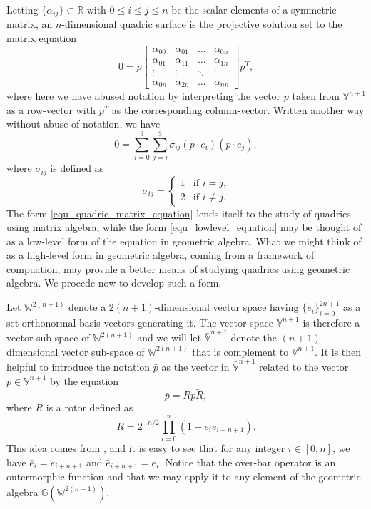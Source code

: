\documentclass{ecgd-l}
\theoremstyle{definition}
\theoremstyle{remark}
\numberwithin{equation}{section}
\newcommand{\G}{\mathbb{G}}
\newcommand{\V}{\mathbb{V}}
\newcommand{\Vb}{\mathbb{\bar{V}}}
\newcommand{\W}{\mathbb{W}}
\newcommand{\R}{\mathbb{R}}
\begin{document}
Letting $\{\alpha_{ij}\}\subset\R$ with $0\leq i\leq j\leq n$ be the scalar elements of a symmetric
matrix, an $n$-dimensional quadric surface is the projective solution set to the
matrix equation
\begin{equation}\label{equ_quadric_matrix_equation}
0 = p\left[\begin{array}{cccc}
\alpha_{00} & \alpha_{01} & \dots & \alpha_{0n} \\
\alpha_{01} & \alpha_{11} & \dots & \alpha_{1n} \\
\vdots & \vdots & \ddots & \vdots \\
\alpha_{0n} & \alpha_{2n} & \dots & \alpha_{nn}
\end{array}\right]p^T,
\end{equation}
where here we have abused notation by interpreting the vector $p$ taken from $\V^{n+1}$ as
a row-vector with $p^T$ as the corresponding column-vector.  Written another
way without abuse of notation, we have
\begin{equation}\label{equ_lowlevel_equation}
0 = \sum_{i=0}^3\sum_{j=i}^3\sigma_{ij}(p\cdot e_i)(p\cdot e_j),
\end{equation}
where $\sigma_{ij}$ is defined as
\begin{equation}
\sigma_{ij} = \left\{\begin{array}{ll}
1 & \mbox{if $i=j$,} \\
2 & \mbox{if $i\neq j$.}
\end{array}\right.
\end{equation}
The form \eqref{equ_quadric_matrix_equation} lends itself to the study
of quadrics using matrix algebra, while the form \eqref{equ_lowlevel_equation}
may be thought of as a low-level form of the equation in geometric algebra.
What we might think of as a high-level form in geometric algebra, coming from
a framework of compuation, may provide a better means of studying quadrics
using geometric algebra.  We procede now to develop such a form.

Let $\W^{2(n+1)}$ denote a $2(n+1)$-dimensional vector space
having $\{e_i\}_{i=0}^{2n+1}$ as a set orthonormal basis vectors
generating it.  The vector space $\V^{n+1}$ is therefore a vector
sub-space of $\W^{2(n+1)}$ and we will let $\Vb^{n+1}$ denote
the $(n+1)$-dimensional vector sub-space of $\W^{2(n+1)}$ that
is complement to $\V^{n+1}$.  It is then helpful to introduce the
notation $\bar{p}$ as the vector in $\Vb^{n+1}$ related to the
vector $p\in\V^{n+1}$ by the equation
\begin{equation}
\bar{p} = Rp\tilde{R},
\end{equation}
where $R$ is a rotor defined as
\begin{equation}
R = 2^{-n/2}\prod_{i=0}^n\left(1-e_ie_{i+n+1}\right).
\end{equation}
This idea comes from \cite{DoranHestenes93}, and it is easy to see
that for any integer $i\in[0,n]$, we have $\bar{e}_i=e_{i+n+1}$
and $\bar{e}_{i+n+1}=e_i$.  Notice that the over-bar operator
is an outermorphic function and that we may apply it to any element
of the geometric algebra $\G(\W^{2(n+1)})$.
\end{document}
